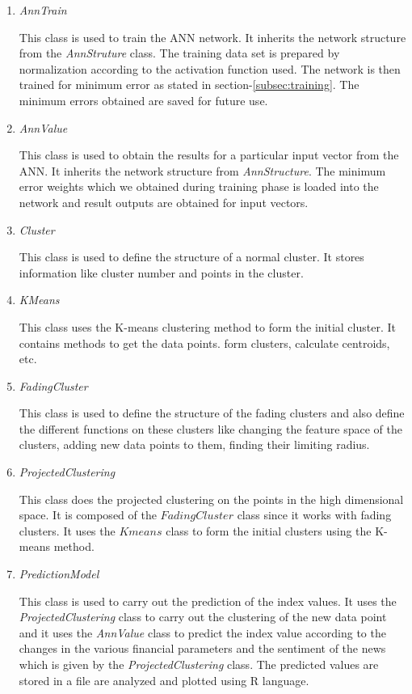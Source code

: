 \documentclass[a4paper,12bp]{report}
\begin{document}
\begin{enumerate}
\item \textit{AnnTrain}

This class is used to train the ANN network. It inherits the network structure from the \textit{AnnStruture} class. The training data set is prepared by normalization according to the activation function used. The network is then trained for minimum error as stated in section-\ref{subsec:training}. The minimum errors obtained are saved for future use. 
\newpage
\item \textit{AnnValue}

This class is used to obtain the results for a particular input vector from the ANN. It inherits the network structure from \textit{AnnStructure}. The minimum error weights which we obtained during training phase is loaded into the network and result outputs are obtained for input vectors.

\item \textit{Cluster}

This class is used to define the structure of a normal cluster. It stores information like cluster number and points in the cluster. 

\item \textit{KMeans}

This class uses the K-means clustering method to form the initial cluster. It contains methods to get the data points. form clusters, calculate centroids, etc. 

\item \textit{FadingCluster}

This class is used to define the structure of the fading clusters and also define the different functions on these clusters like changing the feature space of the clusters, adding new data points to them, finding their limiting radius. 

\item \textit{ProjectedClustering}

This class does the projected clustering on the points in the high dimensional space. It is composed of the $FadingCluster$ class since it works with fading clusters. It uses the $Kmeans$ class to form the initial clusters using the K-means method. 

\item \textit{PredictionModel}

This class is used to carry out the prediction of the index values. It uses the \textit{ProjectedClustering} class to carry out the clustering of the new data point and it uses the \textit{AnnValue} class to predict the index value according to the changes in the various financial parameters and the sentiment of the news which is given by the \textit{ProjectedClustering} class. The predicted values are stored in a file are analyzed and plotted using R language. 


\end{enumerate}
\end{document}
